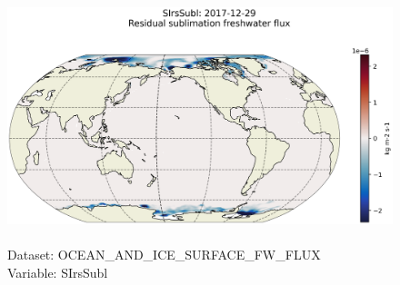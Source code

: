 \begin{figure}[H]
\centering
\includegraphics[scale=0.5]{../images/plots/latlon_plots/Ocean_and_Sea-Ice_Surface_Freshwater_Fluxes/SIrsSubl.png}
\caption{\\Dataset: OCEAN\_AND\_ICE\_SURFACE\_FW\_FLUX\\Variable: SIrsSubl}
\label{tab:table-OCEAN_AND_ICE_SURFACE_FW_FLUX_SIrsSubl-Plot}
\end{figure}
\pagebreak
